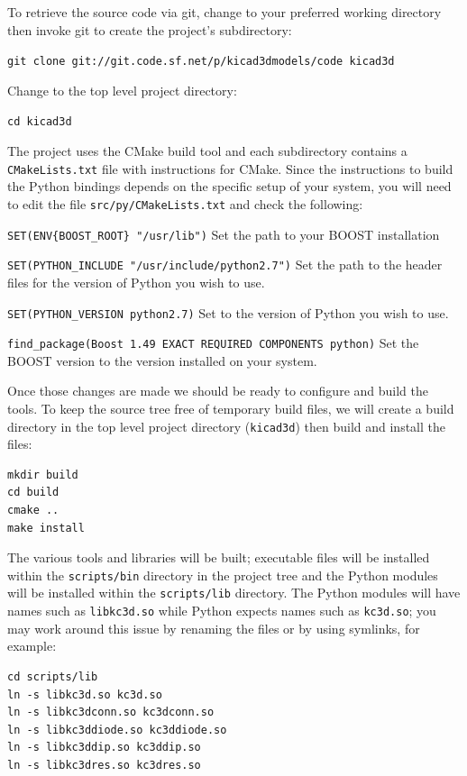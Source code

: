 To retrieve the source code via git, change to your preferred working directory
then invoke git to create the project's subdirectory:

\verb#git clone git://git.code.sf.net/p/kicad3dmodels/code kicad3d#

Change to the top level project directory:

\verb#cd kicad3d#

The project uses the CMake build tool and each subdirectory contains a
\verb#CMakeLists.txt# file with instructions for CMake. Since the 
instructions to build the Python bindings depends on the specific setup
of your system, you will need to edit the file \verb#src/py/CMakeLists.txt#
and check the following:

\verb#SET(ENV{BOOST_ROOT} "/usr/lib")# Set the path to your BOOST installation

\verb#SET(PYTHON_INCLUDE "/usr/include/python2.7")# Set the path to the header
files for the version of Python you wish to use.

\verb#SET(PYTHON_VERSION python2.7)# Set to the version of Python you wish to use.

\verb#find_package(Boost 1.49 EXACT REQUIRED COMPONENTS python)# Set the BOOST version
to the version installed on your system.

Once those changes are made we should be ready to configure and build the tools.
To keep the source tree free of temporary build files, we will create a build
directory in the top level project directory (\verb#kicad3d#) then build and install
the files:

\begin{verbatim}
mkdir build
cd build
cmake ..
make install
\end{verbatim}

The various tools and libraries will be built; executable files will be installed within
the \verb#scripts/bin# directory in the project tree and the Python modules will be
installed within the \verb#scripts/lib# directory. The Python modules will have names
such as \verb#libkc3d.so# while Python expects names such as \verb#kc3d.so#; you may work
around this issue by renaming the files or by using symlinks, for example:

\begin{verbatim}
cd scripts/lib
ln -s libkc3d.so kc3d.so
ln -s libkc3dconn.so kc3dconn.so
ln -s libkc3ddiode.so kc3ddiode.so
ln -s libkc3ddip.so kc3ddip.so
ln -s libkc3dres.so kc3dres.so
\end{verbatim}

